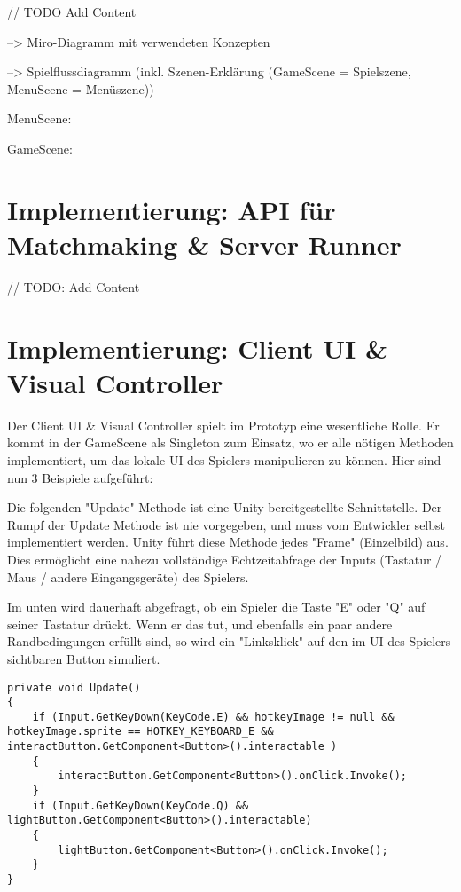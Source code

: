 // TODO Add Content

--> Miro-Diagramm mit verwendeten Konzepten

--> Spielflussdiagramm (inkl. Szenen-Erklärung (GameScene = Spielszene, MenuScene = Menüszene))

MenuScene:

GameScene:

\section{Implementierung: API für Matchmaking \& Server Runner}

// TODO: Add Content

\section{Implementierung: Client UI \& Visual Controller}

Der Client UI \& Visual Controller spielt im Prototyp eine wesentliche Rolle. Er kommt in der GameScene als Singleton \cite{M.Gatrell.2009} zum Einsatz, wo er alle nötigen Methoden implementiert, um das lokale UI des Spielers manipulieren zu können. Hier sind nun 3 Beispiele aufgeführt:

Die folgenden "Update" Methode ist eine Unity bereitgestellte Schnittstelle. Der Rumpf der Update Methode ist nie vorgegeben, und muss vom Entwickler selbst implementiert werden. Unity führt diese Methode jedes "Frame" (Einzelbild) \cite{Wikipedia.2021j} aus. Dies ermöglicht eine nahezu vollständige Echtzeitabfrage der Inputs (Tastatur / Maus / andere Eingangsgeräte) des Spielers.

Im unten wird dauerhaft abgefragt, ob ein Spieler die Taste "E" oder "Q" auf seiner Tastatur drückt. Wenn er das tut, und ebenfalls ein paar andere Randbedingungen erfüllt sind, so wird ein "Linksklick" auf den im UI des Spielers sichtbaren Button simuliert.

\begin{lstlisting}[caption= InGameUiControllerScript.cs Update Method]
private void Update()
{
	if (Input.GetKeyDown(KeyCode.E) && hotkeyImage != null && hotkeyImage.sprite == HOTKEY_KEYBOARD_E && interactButton.GetComponent<Button>().interactable )
	{
		interactButton.GetComponent<Button>().onClick.Invoke();
	}
	if (Input.GetKeyDown(KeyCode.Q) && lightButton.GetComponent<Button>().interactable)
	{
		lightButton.GetComponent<Button>().onClick.Invoke();
	}
}
\end{lstlisting}

